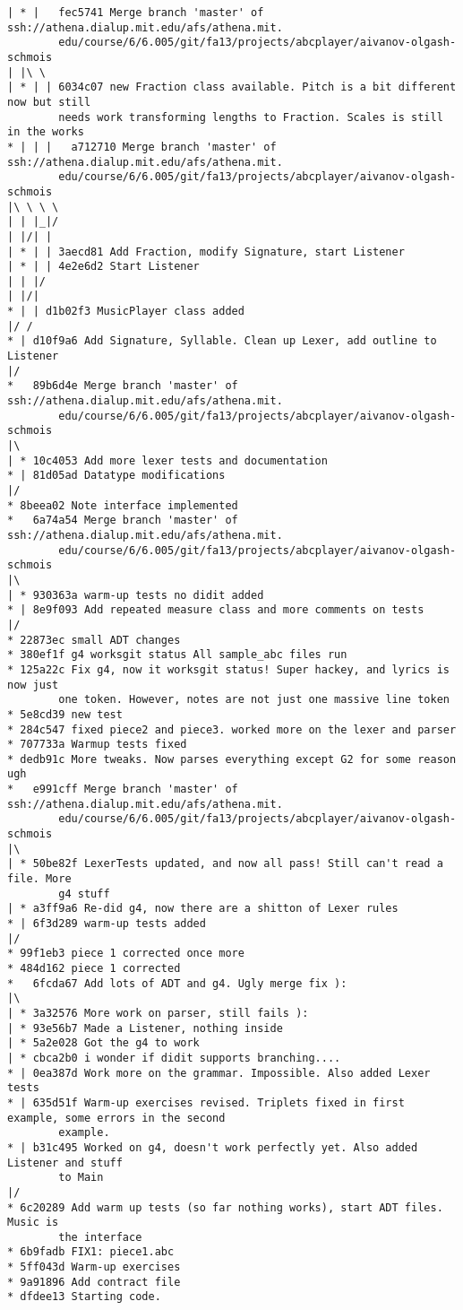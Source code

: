 \documentclass[12pt]{book}
\begin{document}
\begin{Verbatim}
| * |   fec5741 Merge branch 'master' of ssh://athena.dialup.mit.edu/afs/athena.mit.
        edu/course/6/6.005/git/fa13/projects/abcplayer/aivanov-olgash-schmois
| |\ \
| * | | 6034c07 new Fraction class available. Pitch is a bit different now but still 
        needs work transforming lengths to Fraction. Scales is still in the works
* | | |   a712710 Merge branch 'master' of ssh://athena.dialup.mit.edu/afs/athena.mit.
        edu/course/6/6.005/git/fa13/projects/abcplayer/aivanov-olgash-schmois
|\ \ \ \
| | |_|/
| |/| |
| * | | 3aecd81 Add Fraction, modify Signature, start Listener
| * | | 4e2e6d2 Start Listener
| | |/
| |/|
* | | d1b02f3 MusicPlayer class added
|/ /
* | d10f9a6 Add Signature, Syllable. Clean up Lexer, add outline to Listener
|/
*   89b6d4e Merge branch 'master' of ssh://athena.dialup.mit.edu/afs/athena.mit.
        edu/course/6/6.005/git/fa13/projects/abcplayer/aivanov-olgash-schmois
|\
| * 10c4053 Add more lexer tests and documentation
* | 81d05ad Datatype modifications
|/
* 8beea02 Note interface implemented
*   6a74a54 Merge branch 'master' of ssh://athena.dialup.mit.edu/afs/athena.mit.
        edu/course/6/6.005/git/fa13/projects/abcplayer/aivanov-olgash-schmois
|\
| * 930363a warm-up tests no didit added
* | 8e9f093 Add repeated measure class and more comments on tests
|/
* 22873ec small ADT changes
* 380ef1f g4 worksgit status All sample_abc files run
* 125a22c Fix g4, now it worksgit status! Super hackey, and lyrics is now just 
        one token. However, notes are not just one massive line token
* 5e8cd39 new test
* 284c547 fixed piece2 and piece3. worked more on the lexer and parser
* 707733a Warmup tests fixed
* dedb91c More tweaks. Now parses everything except G2 for some reason ugh
*   e991cff Merge branch 'master' of ssh://athena.dialup.mit.edu/afs/athena.mit.
        edu/course/6/6.005/git/fa13/projects/abcplayer/aivanov-olgash-schmois
|\
| * 50be82f LexerTests updated, and now all pass! Still can't read a file. More 
        g4 stuff
| * a3ff9a6 Re-did g4, now there are a shitton of Lexer rules
* | 6f3d289 warm-up tests added
|/
* 99f1eb3 piece 1 corrected once more
* 484d162 piece 1 corrected
*   6fcda67 Add lots of ADT and g4. Ugly merge fix ):
|\
| * 3a32576 More work on parser, still fails ):
| * 93e56b7 Made a Listener, nothing inside
| * 5a2e028 Got the g4 to work
| * cbca2b0 i wonder if didit supports branching....
* | 0ea387d Work more on the grammar. Impossible. Also added Lexer tests
* | 635d51f Warm-up exercises revised. Triplets fixed in first example, some errors in the second 
        example.
* | b31c495 Worked on g4, doesn't work perfectly yet. Also added Listener and stuff 
        to Main
|/
* 6c20289 Add warm up tests (so far nothing works), start ADT files. Music is 
        the interface
* 6b9fadb FIX1: piece1.abc
* 5ff043d Warm-up exercises
* 9a91896 Add contract file
* dfdee13 Starting code.


\end{Verbatim}






\bigskip


      
      
\end{document}
